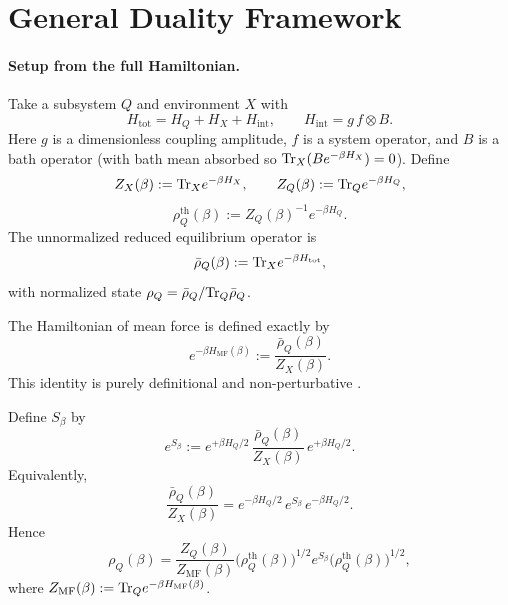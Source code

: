 \section{General Duality Framework}
\label{sec:general_framework}

\paragraph{Setup from the full Hamiltonian.}
Take a subsystem \(Q\) and environment \(X\) with
\begin{equation}
  H_{\mathrm{tot}} = H_Q + H_X + H_{\mathrm{int}}, \qquad
  H_{\mathrm{int}} = g\,f\otimes B.
\end{equation}
Here \(g\) is a dimensionless coupling amplitude, \(f\) is a system operator, and \(B\) is a bath
operator (with bath mean absorbed so \(\mathrm{Tr}_X(B e^{-\beta H_X})=0\)). Define
\begin{equation}
  Z_X(\beta):=\mathrm{Tr}_X e^{-\beta H_X}, \qquad
  Z_Q(\beta):=\mathrm{Tr}_Q e^{-\beta H_Q},
\end{equation}
\begin{equation}
  \rho_Q^{\mathrm{th}}(\beta):= Z_Q(\beta)^{-1}e^{-\beta H_Q}.
\end{equation}
The unnormalized reduced equilibrium operator is
\begin{equation}
  \bar{\rho}_Q(\beta):=\mathrm{Tr}_X e^{-\beta H_{\mathrm{tot}}},
\end{equation}
with normalized state \(\rho_Q=\bar{\rho}_Q/\mathrm{Tr}_Q\bar{\rho}_Q\).

The Hamiltonian of mean force is defined exactly by
\begin{equation}
  e^{-\beta H_{\mathrm{MF}}(\beta)}
  := \frac{\bar{\rho}_Q(\beta)}{Z_X(\beta)}.
\end{equation}
This identity is purely definitional and non-perturbative
\cite{gelinThermodynamicsSubensembleCanonical2009a,hiltHamiltonianMeanForce2011,talknerColloquiumStatisticalMechanics2020,rivasStrongCouplingThermodynamics2020}.

\begin{definition}
\label{def:influence_operator}
Define \(S_\beta\) by
\begin{equation}
  e^{S_\beta}
  := e^{+\beta H_Q/2}\,\frac{\bar{\rho}_Q(\beta)}{Z_X(\beta)}\,e^{+\beta H_Q/2}.
\end{equation}
Equivalently,
\begin{equation}
  \frac{\bar{\rho}_Q(\beta)}{Z_X(\beta)}
  = e^{-\beta H_Q/2}\,e^{S_\beta}\,e^{-\beta H_Q/2}.
\end{equation}
Hence
\begin{equation}
  \rho_Q(\beta)
  = \frac{Z_Q(\beta)}{Z_{\mathrm{MF}}(\beta)}
  \big(\rho_Q^{\mathrm{th}}(\beta)\big)^{1/2}
  e^{S_\beta}
  \big(\rho_Q^{\mathrm{th}}(\beta)\big)^{1/2},
\end{equation}
where \(Z_{\mathrm{MF}}(\beta):=\mathrm{Tr}_Q e^{-\beta H_{\mathrm{MF}}(\beta)}\).
\end{definition}

